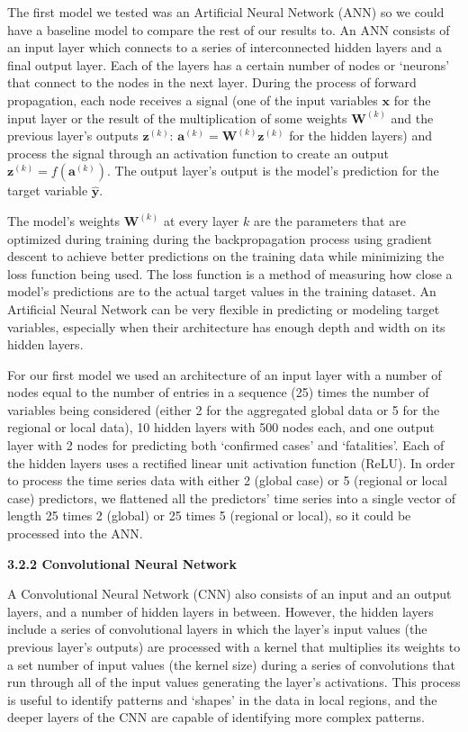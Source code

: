 \documentclass{article}
\begin{document}
The first model we tested was an Artificial Neural Network (ANN) so we could have a baseline model to compare the rest of our results to. An ANN consists of an input layer which connects to a series of interconnected hidden layers and a final output layer. Each of the layers has a certain number of nodes or ‘neurons’ that connect to the nodes in the next layer. During the process of forward propagation, each node receives a signal (one of the input variables $\mathbf{x}$ for the input layer or the result of the multiplication of some weights $\mathbf{W}^{(k)}$ and the previous layer’s outputs $\mathbf{z}^{(k)}$: $\mathbf{a}^{(k)} = \mathbf{W}^{(k)} \mathbf{z}^{(k)}$ for the hidden layers) and process the signal through an activation function to create an output $\mathbf{z}^{(k)} = f(\mathbf{a}^{(k)})$. The output layer’s output is the model’s prediction for the target variable $\mathbf{\hat{y}}$.

The model’s weights $\mathbf{W}^{(k)}$ at every layer $k$ are the parameters that are optimized during training during the backpropagation process using gradient descent to achieve better predictions on the training data while minimizing the loss function being used. The loss function is a method of measuring how close a model’s predictions are to the actual target values in the training dataset. An Artificial Neural Network can be very flexible in predicting or modeling target variables, especially when their architecture has enough depth and width on its hidden layers.

For our first model we used an architecture of an input layer with a number of nodes equal to the number of entries in a sequence (25) times the number of variables being considered (either 2 for the aggregated global data or 5 for the regional or local data), 10 hidden layers with 500 nodes each, and one output layer with 2 nodes for predicting both ‘confirmed cases’ and ‘fatalities’. Each of the hidden layers uses a rectified linear unit activation function (ReLU). In order to process the time series data with either 2 (global case) or 5 (regional or local case) predictors, we flattened all the predictors’ time series into a single vector of length 25 times 2 (global) or 25 times 5 (regional or local), so it could be processed into the ANN.

\textbf{3.2.2 Convolutional Neural Network}

A Convolutional Neural Network (CNN) also consists of an input and an output layers, and a number of hidden layers in between. However, the hidden layers include a series of convolutional layers in which the layer’s input values (the previous layer’s outputs) are processed with a kernel that multiplies its weights to a set number of input values (the kernel size) during a series of convolutions that run through all of the input values generating the layer’s activations. This process is useful to identify patterns and ‘shapes’ in the data in local regions, and the deeper layers of the CNN are capable of identifying more complex patterns.
\end{document}
